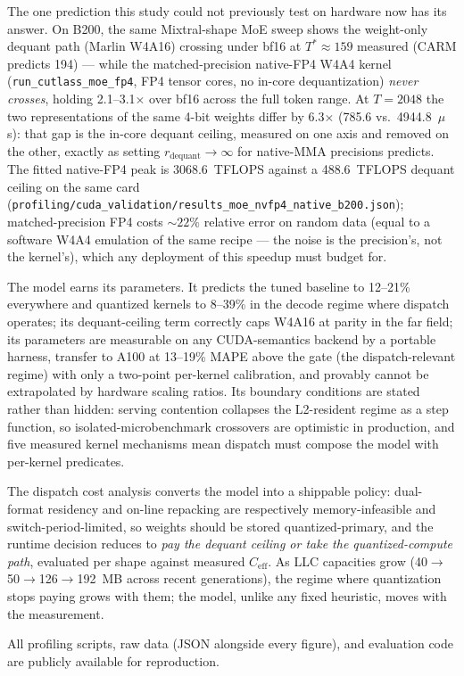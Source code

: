 \documentclass[10pt,twocolumn]{article}
\begin{document}
The one prediction this study could not previously test on hardware now has its answer.  On B200, the same Mixtral-shape MoE sweep shows the weight-only dequant path (Marlin W4A16) crossing under bf16 at $T^*{\approx}159$ measured (CARM predicts 194) --- while the matched-precision native-FP4 W4A4 kernel (\texttt{run\_cutlass\_moe\_fp4}, FP4 tensor cores, no in-core dequantization) \emph{never crosses}, holding 2.1--3.1$\times$ over bf16 across the full token range.  At $T{=}2048$ the two representations of the same 4-bit weights differ by 6.3$\times$ (785.6 vs.\ 4944.8~$\mu$s): that gap is the in-core dequant ceiling, measured on one axis and removed on the other, exactly as setting $r_\text{dequant}\to\infty$ for native-MMA precisions predicts.  The fitted native-FP4 peak is 3068.6~TFLOPS against a 488.6~TFLOPS dequant ceiling on the same card (\texttt{profiling/cuda\_validation/results\_moe\_nvfp4\_native\_b200.json}); matched-precision FP4 costs ${\sim}22\%$ relative error on random data (equal to a software W4A4 emulation of the same recipe --- the noise is the precision's, not the kernel's), which any deployment of this speedup must budget for.

The model earns its parameters.  It predicts the tuned baseline to 12--21\% everywhere and quantized kernels to 8--39\% in the decode regime where dispatch operates; its dequant-ceiling term correctly caps W4A16 at parity in the far field; its parameters are measurable on any CUDA-semantics backend by a portable harness, transfer to A100 at 13--19\% MAPE above the gate (the dispatch-relevant regime) with only a two-point per-kernel calibration, and provably cannot be extrapolated by hardware scaling ratios.  Its boundary conditions are stated rather than hidden: serving contention collapses the L2-resident regime as a step function, so isolated-microbenchmark crossovers are optimistic in production, and five measured kernel mechanisms mean dispatch must compose the model with per-kernel predicates.

The dispatch cost analysis converts the model into a shippable policy: dual-format residency and on-line repacking are respectively memory-infeasible and switch-period-limited, so weights should be stored quantized-primary, and the runtime decision reduces to \emph{pay the dequant ceiling or take the quantized-compute path}, evaluated per shape against measured $C_\text{eff}$.  As LLC capacities grow (40$\to$50$\to$126$\to$192~MB across recent generations), the regime where quantization stops paying grows with them; the model, unlike any fixed heuristic, moves with the measurement.

All profiling scripts, raw data (JSON alongside every figure), and evaluation code are publicly available for reproduction.




\end{document}

